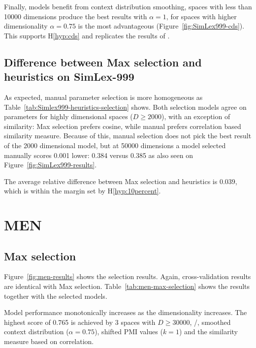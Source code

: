 
Finally, models benefit from context distribution smoothing, spaces with less than 10000 dimensions produce the best results with $\alpha = 1$, for spaces with higher dimensionality $\alpha = 0.75$ is the most advantageous (Figure~\ref{fig:SimLex999-cds}). This supports H\ref{hyp:cds} and replicates the results of .



\subsection{Difference between Max selection and heuristics on SimLex-999}

As expected, manual parameter selection is more homogeneous as Table~\ref{tab:Simlex999-heuristics-selection} shows. Both selection models agree on parameters for highly dimensional spaces ($D \geq 2000$), with an exception of similarity: Max selection prefers cosine, while manual prefers correlation based similarity measure. Because of this, manual selection does not pick the best result of the 2000 dimensional model, but at 50000 dimensions a model selected manually scores 0.001 lower: 0.384 versus 0.385 as also seen on Figure~\ref{fig:SimLex999-results}.

The average relative difference between Max selection and heuristics is 0.039, which is within the margin set by H\ref{hyp:10percent}.

\section{MEN}
\label{sec:men}

\subsection{Max selection}
\label{sec:max-selection-men}



Figure~\ref{fig:men-results} shows the selection results. Again, cross-validation results are identical with Max selection. Table~\ref{tab:men-max-selection} shows the results together with the selected models.



Model performance monotonically increases as the dimensionality increases. The highest score of 0.765 is achieved by 3 spaces with $D \geq 30000$, \logNSCPMI/, smoothed context distribution ($\alpha = 0.75$), shifted PMI values ($k = 1$) and the similarity measure based on correlation.

